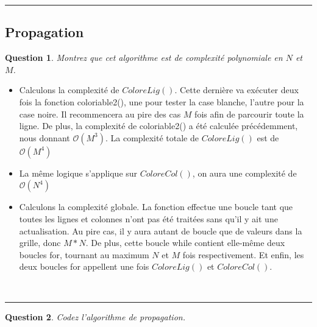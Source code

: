 \documentclass[a4paper,12pt]{article}
\newtheorem{exo}{Question}
\begin{document}
\noindent\rule{\textwidth}{1pt}
\newpage


\subsection{Propagation}

\begin{exo}
	Montrez que cet algorithme est de complexité polynomiale en $N$ et $M$.
\end{exo}

\begin{itemize}
	\item Calculons la complexité de $ColoreLig()$. Cette dernière va exécuter deux fois la fonction coloriable2(), une pour tester la case blanche, l'autre pour la case noire. Il recommencera au pire des cas $M$ fois afin de parcourir toute la ligne. De plus, la complexité de coloriable2() a été calculée précédemment, nous donnant $\mathcal{O}(M^3)$. La complexité totale de $ColoreLig()$ est de $\mathcal{O}(M^4)$
	\item La même logique s'applique sur $ColoreCol()$, on aura une complexité de $\mathcal{O}(N^4)$
	\item Calculons la complexité globale. La fonction effectue une boucle tant que toutes les lignes et colonnes n'ont pas été traitées sans qu'il y ait une actualisation. Au pire cas, il y aura autant de boucle que de valeurs dans la grille, donc $M*N$. De plus, cette boucle while contient elle-même deux boucles for, tournant au maximum $N$ et $M$ fois respectivement. Et enfin, les deux boucles for appellent une fois $ColoreLig()$ et $ColoreCol()$.\\
\end{itemize}

\\

\noindent\rule{\textwidth}{1pt}


\begin{exo}
	Codez l'algorithme de propagation.
\end{exo}
\end{document}
